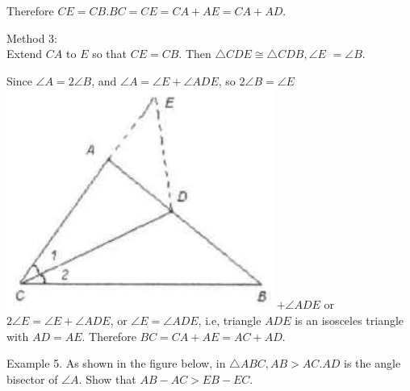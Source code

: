 \documentclass[10pt]{article}
\begin{document}
Therefore \(C E=C B . B C=C E=C A+A E=C A+A D\).


Method 3:\\
Extend \(C A\) to \(E\) so that \(C E=C B\). Then \(\triangle C D E \cong \triangle C D B, \angle E\) \(=\angle B\).

Since \(\angle A=2 \angle B\), and \(\angle A=\angle E+\angle A D E\), so \(2 \angle B=\angle E\)\\
\includegraphics[max width=\textwidth]{2025_04_17_97bc1f7e44d93c271a88g-057} \(+\angle A D E\) or \(2 \angle E=\angle E+\angle A D E\), or \(\angle E=\angle A D E\), i.e, triangle \(A D E\) is an isosceles triangle with \(A D=A E\). Therefore \(B C=C A+A E=A C+A D\).

Example 5. As shown in the figure below, in \(\triangle A B C, A B>A C . A D\) is the angle bisector of \(\angle A\). Show that \(A B-A C>E B-E C\).
\end{document}
